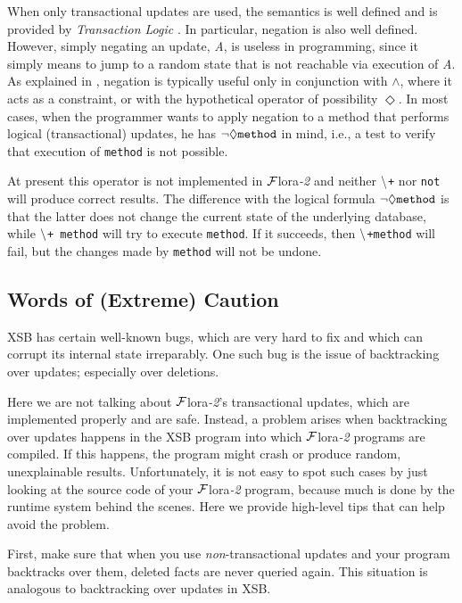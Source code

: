 \documentclass[11pt]{article}
\newcommand{\FLORA}{{\mbox{\sc ${\cal F}${lora}\rm\emph{-2}}}\xspace}
\newcommand{\NAF}{\mbox{\tt \ensuremath{\tt\backslash}+}\xspace}
\newcommand{\TNOT}{{{\tt not}}\xspace}
\begin{document}
When only transactional updates are used, the semantics is well defined and
is provided by \emph{Transaction Logic}
\cite{trans-chapter-98,trans-tcs94}. In particular, negation is also well
defined. However, simply negating an update, \emph{A}, is useless in
programming, since it simply means to jump to a random state that is not
reachable via execution of \emph{A}.  As explained in
\cite{trans-chapter-98,trans-tcs94}, negation is typically useful only in conjunction
with $\wedge$, where it acts as a constraint, or with the hypothetical
operator of possibility $\Diamond$. In most cases, when the programmer
wants to apply negation to a method that performs logical (transactional)
updates, he has $\tt \neg \Diamond method$ in mind, i.e., a test to
verify that execution of {\tt method} is not possible.

At present this operator is not implemented in \FLORA and neither \NAF
nor \TNOT will produce correct results.  The difference with
the logical formula $\tt \neg \Diamond method$ is that the latter does not
change the current state of the underlying database, while \NAF {\tt
  method} 
will try to execute {\tt method}. If it succeeds, then \NAF {\tt method} 
will fail, but the changes made by {\tt method} will not be undone.


\subsection{Words of (Extreme) Caution}

XSB has certain well-known bugs, which are very hard to fix and which can
corrupt its internal state irreparably. One such bug is the issue of
backtracking over updates; especially over deletions.

Here we are not talking about \FLORA's transactional updates, which are
implemented properly and are safe. Instead, a problem arises when
backtracking over updates happens in the XSB program into which \FLORA
programs are compiled. If this happens, the program might crash or produce
random, unexplainable results. Unfortunately, it is not easy to spot such
cases by just looking at the source code of your \FLORA program, because much
is done by the runtime system behind the scenes. Here we provide high-level
tips that can help avoid the problem.

First, make sure that when you use \emph{non}-transactional updates and
your program backtracks over them, deleted facts are never queried again.
This situation is analogous to backtracking over updates in XSB.
\end{document}

